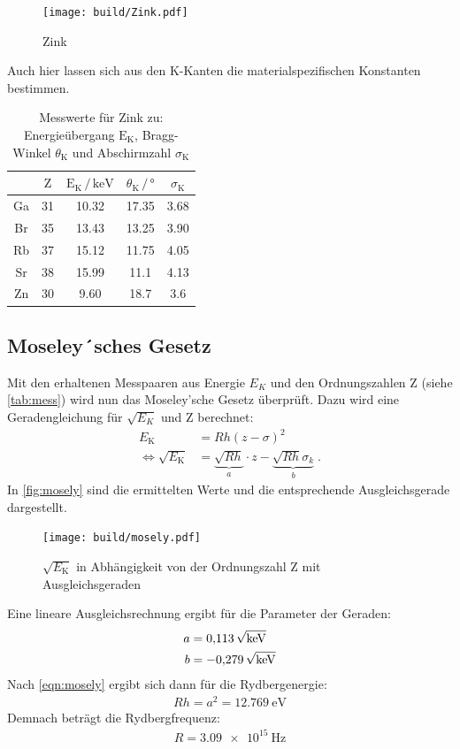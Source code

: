 \begin{figure}[H]
  \centering
  \texttt{[image: build/Zink.pdf]}
  \caption{Zink}
  \label{fig:Zink}
\end{figure}
Auch hier lassen sich aus den K-Kanten die materialspezifischen Konstanten bestimmen.
\begin{table}[H]
  \centering
  \caption{Messwerte für Zink zu: Energieübergang $\text{E}_\text{K}$, Bragg-Winkel $\theta_\text{K}$ und Abschirmzahl $\sigma_\text{K}$}
  \label{tab:mess}
  \begin{tabular}{c c c c c}
  \toprule
       & $\text{Z}$ & $\text{E}_\text{K} \,/\, \mathrm{keV}$ & $\theta_\text{K} \,/\, ° $ & $\sigma_\text{K} $\\
  \midrule 
    Ga & 31 & 10.32 & 17.35 & 3.68 \\
    Br & 35 & 13.43 & 13.25 & 3.90 \\
    Rb & 37 & 15.12 & 11.75 & 4.05 \\
    Sr & 38 & 15.99 & 11.1 & 4.13 \\
    Zn & 30 & 9.60  & 18.7 & 3.6 \\
  \bottomrule
  \end{tabular}
  \end{table}
\noindent

\subsection{Moseley´sches Gesetz}
Mit den erhaltenen Messpaaren aus Energie $E_K$ und den Ordnungszahlen Z (siehe \autoref{tab:mess}) wird nun das Moseley'sche Gesetz überprüft.
Dazu wird eine Geradengleichung für $\sqrt{E_K}$ und Z berechnet:
\begin{align}
    E_\text{K} &= R h (z - \sigma)^2 \\
    \Leftrightarrow
    \sqrt{E_\text{K}} &= \underbrace{\sqrt{R h}}_a \cdot z - \underbrace{\sqrt{R h} \sigma_k}_b \; .
  \label{eqn:mosely}
\end{align}
In \autoref{fig:mosely} sind die ermittelten Werte und die entsprechende Ausgleichsgerade dargestellt.
\begin{figure}[H]
  \centering
  \texttt{[image: build/mosely.pdf]}
  \caption{$\sqrt{E_\text{K}}$ in Abhängigkeit von der Ordnungszahl Z mit Ausgleichsgeraden}
  \label{fig:mosely}
\end{figure}
\noindent
Eine lineare Ausgleichsrechnung ergibt für die Parameter der Geraden:
\begin{align*}
    a &= \SI{0.113}{\sqrt{\kilo\electronvolt}} \\
    b &= \SI{-0.279}{\sqrt{\kilo\electronvolt}} \\
\end{align*}
Nach \autoref{eqn:mosely} ergibt sich dann für die Rydbergenergie:
\begin{align*}
  Rh = a^2 = \SI{12.769}{\electronvolt}
\end{align*}
Demnach beträgt die Rydbergfrequenz:
\begin{align*}
  R = \SI{3.09e15}{\hertz}
\end{align*}